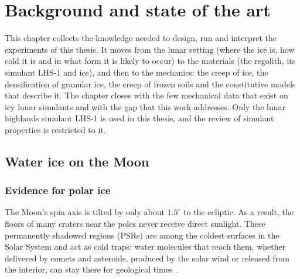 \chapter{Background and state of the art}
\label{ch:background}%

This chapter collects the knowledge needed to design, run and interpret the experiments of this thesis. It moves from the lunar setting (where the ice is, how cold it is and in what form it is likely to occur) to the materials (the regolith, its simulant LHS-1 and ice), and then to the mechanics: the creep of ice, the densification of granular ice, the creep of frozen soils and the constitutive models that describe it. The chapter closes with the few mechanical data that exist on icy lunar simulants and with the gap that this work addresses. Only the lunar highlands simulant LHS-1 is used in this thesis, and the review of simulant properties is restricted to it.

\section{Water ice on the Moon}
\label{sec:lunar_ice}

\subsection{Evidence for polar ice}

The Moon's spin axis is tilted by only about $1.5^\circ$ to the ecliptic. As a result, the floors of many craters near the poles never receive direct sunlight. These permanently shadowed regions (PSRs) are among the coldest surfaces in the Solar System and act as cold traps: water molecules that reach them, whether delivered by comets and asteroids, produced by the solar wind or released from the interior, can stay there for geological times~\cite{vasavada1999,lucey2022}.

